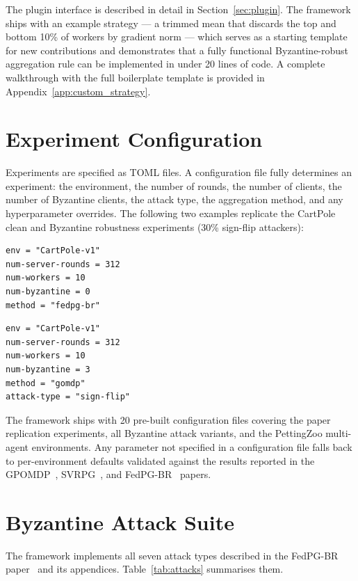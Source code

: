 \documentclass[a4paper, oneside]{discothesis}
\begin{document}
The plugin interface is described in detail in Section~\ref{sec:plugin}. The framework ships with an example strategy --- a trimmed mean that discards the top and bottom 10\% of workers by gradient norm --- which serves as a starting template for new contributions and demonstrates that a fully functional Byzantine-robust aggregation rule can be implemented in under 20 lines of code. A complete walkthrough with the full boilerplate template is provided in Appendix~\ref{app:custom_strategy}.

\section{Experiment Configuration}
\label{sec:bench:configs}

Experiments are specified as TOML files. A configuration file fully determines an experiment: the environment, the number of rounds, the number of clients, the number of Byzantine clients, the attack type, the aggregation method, and any hyperparameter overrides. The following two examples replicate the CartPole clean and Byzantine robustness experiments (30\% sign-flip attackers):

\begin{verbatim}
env = "CartPole-v1"
num-server-rounds = 312
num-workers = 10
num-byzantine = 0
method = "fedpg-br"
\end{verbatim}

\begin{verbatim}
env = "CartPole-v1"
num-server-rounds = 312
num-workers = 10
num-byzantine = 3
method = "gomdp"
attack-type = "sign-flip"
\end{verbatim}

The framework ships with 20 pre-built configuration files covering the paper replication experiments, all Byzantine attack variants, and the PettingZoo multi-agent environments. Any parameter not specified in a configuration file falls back to per-environment defaults validated against the results reported in the GPOMDP~\cite{GPOMDP}, SVRPG~\cite{SVRPG}, and FedPG-BR~\cite{FedPGBR} papers.

\section{Byzantine Attack Suite}
\label{sec:bench:attacks}

The framework implements all seven attack types described in the FedPG-BR paper~\cite{FedPGBR} and its appendices. Table~\ref{tab:attacks} summarises them.
\end{document}

